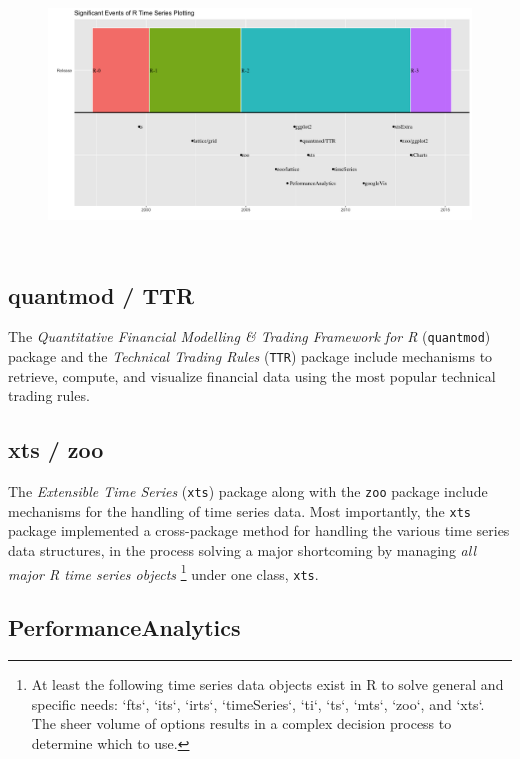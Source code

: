 \begin{figure}[htbp]
  \centering
  \includegraphics[width=13cm, height=7cm]{img/timeline}
  \timeline
\end{figure}

\subsection{quantmod / TTR}\label{quantmod-ttr}

The \emph{Quantitative Financial Modelling \& Trading Framework for R}
(\texttt{quantmod}) package and the \emph{Technical Trading Rules}
(\texttt{TTR}) package include mechanisms to retrieve, compute, and
visualize financial data using the most popular technical trading rules.

\subsection{xts / zoo}\label{xts-zoo}

The \emph{Extensible Time Series} (\texttt{xts}) package along with the
\texttt{zoo} package include mechanisms for the handling of time series
data. Most importantly, the \texttt{xts} package implemented a
cross-package method for handling the various time series data
structures, in the process solving a major shortcoming by managing
\emph{all major R time series objects}
\footnote{At least the following time series data objects exist in R to solve general and specific needs: `fts`, `its`, `irts`, `timeSeries`, `ti`, `ts`, `mts`, `zoo`, and `xts`. The sheer volume of options results in a complex decision process to determine which to use.}
under one class, \texttt{xts}.

\subsection{PerformanceAnalytics}\label{performanceanalytics}


